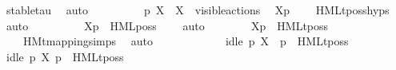 \begin{isabellebody}
\ stable{\isacharunderscore}{\kern0pt}tau\ \isamarkupfalse%
\ auto\isanewline
\ \ \ \ \ \ \isamarkupfalse%
\ \isamarkupfalse%
\ {\isacartoucheopen}p{\isacharprime}{\kern0pt}\ {\isasymTTurnstile}{\isacharbrackleft}{\kern0pt}X{\isacharbrackright}{\kern0pt}\ {\isasymphi}{\isacartoucheclose}\ {\isacartoucheopen}X\ {\isasymsubseteq}\ visible{\isacharunderscore}{\kern0pt}actions{\isacartoucheclose}\ \isamarkupfalse%
\ {\isacartoucheopen}{\isasymtheta}{\isacharbrackleft}{\kern0pt}X{\isacharbrackright}{\kern0pt}{\isacharparenleft}{\kern0pt}p{\isacharprime}{\kern0pt}{\isacharparenright}{\kern0pt}\ {\isasymTurnstile}\ {\isasymsigma}{\isacharparenleft}{\kern0pt}{\isasymphi}{\isacharparenright}{\kern0pt}{\isacartoucheclose}\ \isamarkupfalse%
\ HMLt{\isacharunderscore}{\kern0pt}poss{\isachardot}{\kern0pt}hyps\ \isamarkupfalse%
\ auto\isanewline
\ \ \ \ \ \ \isamarkupfalse%
\ \isamarkupfalse%
\ {\isacartoucheopen}{\isasymtheta}{\isacharbrackleft}{\kern0pt}X{\isacharbrackright}{\kern0pt}{\isacharparenleft}{\kern0pt}p{\isacharparenright}{\kern0pt}\ {\isasymTurnstile}\ HML{\isacharunderscore}{\kern0pt}poss\ {\isasymtau}\ {\isasymsigma}{\isacharparenleft}{\kern0pt}{\isasymphi}{\isacharparenright}{\kern0pt}{\isacartoucheclose}\ \isamarkupfalse%
\ auto\isanewline
\ \ \ \ \ \ \isamarkupfalse%
\ {\isacartoucheopen}{\isasymtheta}{\isacharbrackleft}{\kern0pt}X{\isacharbrackright}{\kern0pt}{\isacharparenleft}{\kern0pt}p{\isacharparenright}{\kern0pt}\ {\isasymTurnstile}\ {\isasymsigma}{\isacharparenleft}{\kern0pt}HMLt{\isacharunderscore}{\kern0pt}poss\ {\isasymalpha}\ {\isasymphi}{\isacharparenright}{\kern0pt}{\isacartoucheclose}\ \isamarkupfalse%
\ {\isacartoucheopen}{\isasymalpha}\ {\isacharequal}{\kern0pt}\ {\isasymtau}{\isacartoucheclose}\ HMt{\isacharunderscore}{\kern0pt}mapping{\isachardot}{\kern0pt}simps{\isacharparenleft}{\kern0pt}{}{\isacharparenright}{\kern0pt}\ \isamarkupfalse%
\ auto\isanewline
\ \ \ \ \isamarkupfalse%
\isanewline
\ \ \ \ \ \ \isamarkupfalse%
\ {\isacartoucheopen}idle\ p\ X\ {\isasymand}\ p\ {\isasymTTurnstile}\ HMLt{\isacharunderscore}{\kern0pt}poss\ {\isasymalpha}\ {\isasymphi}{\isacartoucheclose}\isanewline
\ \ \ \ \ \ \isamarkupfalse%
\ {\isacartoucheopen}idle\ p\ X{\isacartoucheclose}\ {\isacartoucheopen}p\ {\isasymTTurnstile}\ HMLt{\isacharunderscore}{\kern0pt}poss\ {\isasymalpha}\ {\isasymphi}{\isacartoucheclose}\ \isamarkupfalse%

\end{isabellebody}

